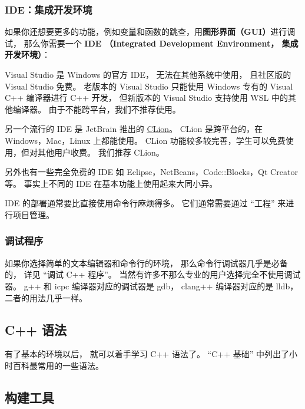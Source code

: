 \subsubsection{IDE：集成开发环境}
如果你还想要更多的功能，例如变量和函数的跳查，用\textbf{图形界面（GUI）}进行调试， 那么你需要一个 \textbf{IDE （Integrated Development Environment， 集成开发环境）}：

Visual Studio 是 Windows 的官方 IDE， 无法在其他系统中使用， 且社区版的 Visual Studio 免费。 老版本的 Visual Studio 只能使用 Windows 专有的 Visual C++ 编译器进行 C++ 开发， 但新版本的 Visual Studio 支持使用 WSL 中的其他编译器。 由于不能跨平台，我们不推荐使用。

另一个流行的 IDE 是 JetBrain 推出的 \href{https://www.jetbrains.com/clion/}{CLion}。 CLion 是跨平台的，在 Windows，Mac，Linux 上都能使用。 CLion 功能较多较完善，学生可以免费使用，但对其他用户收费。 我们推荐 CLion。

另外也有一些完全免费的 IDE 如 Eclipse，NetBeans，Code::Blocks，Qt Creator 等。 事实上不同的 IDE 在基本功能上使用起来大同小异。

IDE 的部署通常要比直接使用命令行麻烦得多。 它们通常需要通过 “工程” 来进行项目管理。

\subsubsection{调试程序}
如果你选择简单的文本编辑器和命令行的环境， 那么命令行调试器几乎是必备的， 详见 “调试 C++ 程序”。 当然有许多不那么专业的用户选择完全不使用调试器。 g++ 和 icpc 编译器对应的调试器是 gdb， clang++ 编译器对应的是 lldb， 二者的用法几乎一样。

\subsection{C++ 语法}
有了基本的环境以后， 就可以着手学习 C++ 语法了。 “C++ 基础” 中列出了小时百科最常用的一些语法。

\subsection{构建工具}
